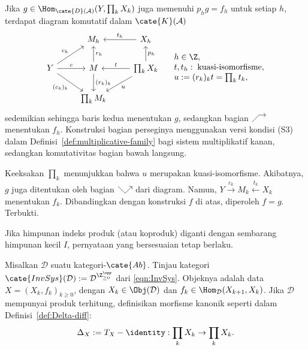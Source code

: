 \begin{bukti}
	Jika $g\in\Hom_{\cate{D}(\mathcal{A})}(Y,\prod_kX_k)$ juga memenuhi
	$p_hg=f_h$ untuk setiap $h$, terdapat diagram komutatif dalam
	$\cate{K}(\mathcal{A})$
	\[\begin{tikzcd}
		& M_h & X_h \arrow[l, "t_h"'] \\
		Y \arrow[r, "c"] \arrow[ru, "c_h"] \arrow[rd, "{(c_k)_k}"'] & M \arrow[u, "r_h"'] \arrow[d, "(r_k)_k"] & \prod_k X_k \arrow[l, "t"'] \arrow[u, "p_h"'] \arrow[ld, "u"] \\
		& \prod_k M_k &
	\end{tikzcd} \quad \begin{array}{l}
		h \in \Z, \\
		t, t_h:\;\text{kuasi-isomorfisme}, \\
		u := (r_k)_k t = \prod_k t_k ,
	\end{array}\]
	sedemikian sehingga baris kedua menentukan $g$, sedangkan bagian
	$\begin{tikzpicture}[xscale=0.3, yscale=0.3, baseline=(O)]
		\coordinate (O) at (0, -0.8);
		\draw[->] (0,-1) -- (1, 0) -- (2, 0);
	\end{tikzpicture}$
	menentukan $f_h$. Konstruksi bagian perseginya menggunakan versi kondisi
	(S3) dalam Definisi~\ref{def:multiplicative-family} bagi sistem
	multiplikatif kanan, sedangkan komutativitas bagian bawah langsung.

	Keeksakan $\prod_k$ menunjukkan bahwa $u$ merupakan kuasi-isomorfisme.
	Akibatnya, $g$ juga ditentukan oleh bagian
	$\begin{tikzpicture}[xscale=0.3, yscale=0.3, baseline=(O)]
		\coordinate (O) at (0, -0.8);
		\draw[->] (0,0) -- (1, -1) -- (2, 0);
	\end{tikzpicture}$
	dari diagram. Namun, $Y\xrightarrow{c_k}M_k\xleftarrow{t_k}X_k$
	menentukan $f_k$. Dibandingkan dengan konstruksi $f$ di atas, diperoleh
	$f=g$. Terbukti.
\end{bukti}

\begin{catatan}
	Jika himpunan indeks produk (atau koproduk) diganti dengan sembarang himpunan
	kecil $I$, pernyataan yang bersesuaian tetap berlaku.
\end{catatan}

Misalkan $\mathcal{D}$ suatu kategori-$\cate{Ab}$. Tinjau kategori
$\cate{InvSys}(\mathcal{D}):=\mathcal{D}^{\Z_{\geq0}^{\opp}}$ dari
\eqref{eqn:InvSys}. Objeknya adalah data $X=(X_k,f_k)_{k\geq0}$, dengan
$X_k\in\Obj(\mathcal{D})$ dan
$f_k\in\Hom_{\mathcal{D}}(X_{k+1},X_k)$. Jika $\mathcal{D}$ mempunyai produk
terhitung, definisikan morfisme kanonik seperti dalam
Definisi~\ref{def:Delta-diff}:
	\[ \Delta_X := T_X - \identity: \prod_k X_k \to \prod_k X_k. \]

